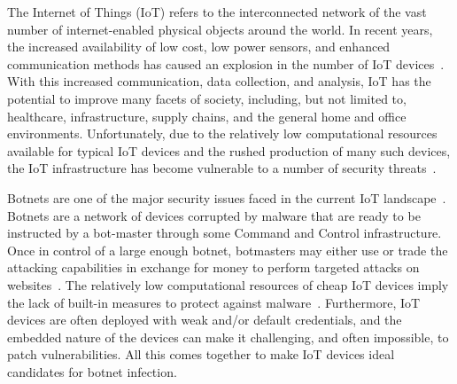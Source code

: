  
The Internet of Things (IoT) refers to the interconnected network of the vast number of internet-enabled physical objects around the world. In recent years, the increased availability of low cost, low power sensors, and enhanced communication methods has caused an explosion in the number of IoT devices~\cite{atzori2010_IoT_Survey}. With this increased communication, data collection, and analysis, IoT has the potential to improve many facets of society, including, but not limited to, healthcare, infrastructure, supply chains, and the general home and office environments. Unfortunately, due to the relatively low computational resources available for typical IoT devices and the rushed production of many such devices, the IoT infrastructure has become vulnerable to a number of security threats~\cite{alaba2017_IoT_Security_Survey}.

Botnets are one of the major security issues faced in the current IoT landscape~\cite{silva2013_Botnet_Survey}. Botnets are a network of devices corrupted by malware that are ready to be instructed by a bot-master through some Command and Control infrastructure. Once in control of a large enough botnet, botmasters may either use or trade the attacking capabilities in exchange for money to perform targeted attacks on websites~\cite{kolias2017_Mirai_DDoS}. The relatively low computational resources of cheap IoT devices imply the lack of built-in measures to protect against malware~\cite{bertino2017_Botnets_IoT}. Furthermore, IoT devices are often deployed with weak and/or default credentials, and the embedded nature of the devices can make it challenging, and often impossible, to patch vulnerabilities. All this comes together to make IoT devices ideal candidates for botnet infection.

